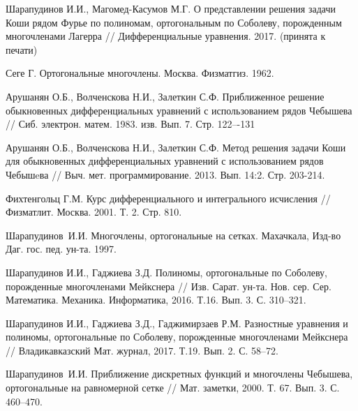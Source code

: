 \begin{thebibliography}{99}
{Шарапудинов И.И., Магомед-Касумов М.Г.}
О представлении решения задачи Коши  рядом Фурье  по полиномам, ортогональным по  Соболеву, порожденным многочленами Лагерра // Дифференциальные уравнения. 2017. (принята к печати)









Сеге Г. Ортогональные многочлены. Москва. Физматгиз. 1962.



{Арушанян О.Б., Волченскова Н.И., Залеткин С.Ф.}
Приближенное решение обыкновенных дифференциальных уравнений с использованием рядов Чебышева // Сиб. электрон. матем. 1983. изв. Вып. 7. Стр. 122–-131



{Арушанян О.Б., Волченскова Н.И., Залеткин С.Ф.}
Метод решения задачи Коши для обыкновенных дифференциальных уравнений с использованием рядов Чебышeва // Выч. мет. программирование. 2013. Вып. 14:2. Стр. 203-214.



{Фихтенгольц Г.М.}
Курс дифференциального и интегрального исчисления // Физматлит. Москва. 2001. Т. 2. Стр. 810.



{Шарапудинов~И.И.} Многочлены, ортогональные на сетках. Махачкала, Изд-во Даг. гос. пед. ун-та. 1997.		



{Шарапудинов И.И., Гаджиева З.Д.}
Полиномы, ортогональные по Соболеву, порожденные многочленами Мейкснера // Изв. Сарат. ун-та. Нов. сер. Сер. Математика. Механика. Информатика,
2016. Т.16. Вып. 3. С. 310--321.



{Шарапудинов И.И., Гаджиева З.Д., Гаджимирзаев Р.М.}
Разностные уравнения и полиномы, ортогональные по Соболеву, порожденные многочленами Мейкснера //
Владикавказский Мат. журнал, 2017. Т.19. Вып. 2. С. 58--72.



{Шарапудинов~И.И.}
Приближение дискретных функций и многочлены Чебышева, ортогональные на равномерной сетке //
Мат. заметки, 2000. Т. 67. Вып. 3. С. 460--470.




\end{thebibliography}
